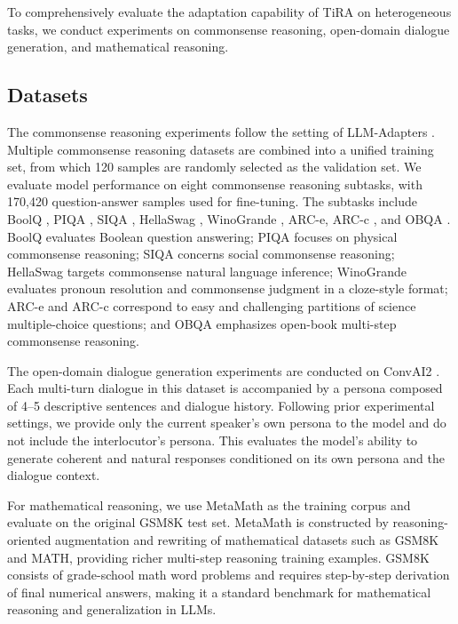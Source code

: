 \documentclass[a4paper,11pt]{article}
\begin{document}
To comprehensively evaluate the adaptation capability of TiRA on heterogeneous tasks, we conduct experiments on commonsense reasoning, open-domain dialogue generation, and mathematical reasoning.

\subsection{Datasets}

The commonsense reasoning experiments follow the setting of LLM-Adapters \cite{hu2023llmadapters}. Multiple commonsense reasoning datasets are combined into a unified training set, from which 120 samples are randomly selected as the validation set. We evaluate model performance on eight commonsense reasoning subtasks, with 170,420 question-answer samples used for fine-tuning. The subtasks include BoolQ \cite{bisk2019boolq}, PIQA \cite{bisk2020piqa}, SIQA \cite{sap2019socialiqa}, HellaSwag \cite{zellers2019hellaswag}, WinoGrande \cite{sakaguchi2021winogrande}, ARC-e, ARC-c \cite{clark2018arc}, and OBQA \cite{mihaylov2018openbookqa}. BoolQ evaluates Boolean question answering; PIQA focuses on physical commonsense reasoning; SIQA concerns social commonsense reasoning; HellaSwag targets commonsense natural language inference; WinoGrande evaluates pronoun resolution and commonsense judgment in a cloze-style format; ARC-e and ARC-c correspond to easy and challenging partitions of science multiple-choice questions; and OBQA emphasizes open-book multi-step commonsense reasoning.

The open-domain dialogue generation experiments are conducted on ConvAI2 \cite{dinan2019convai2}. Each multi-turn dialogue in this dataset is accompanied by a persona composed of 4--5 descriptive sentences and dialogue history. Following prior experimental settings, we provide only the current speaker's own persona to the model and do not include the interlocutor's persona. This evaluates the model's ability to generate coherent and natural responses conditioned on its own persona and the dialogue context.

For mathematical reasoning, we use MetaMath \cite{yu2024metamath} as the training corpus and evaluate on the original GSM8K \cite{cobbe2021gsm8k} test set. MetaMath is constructed by reasoning-oriented augmentation and rewriting of mathematical datasets such as GSM8K and MATH, providing richer multi-step reasoning training examples. GSM8K consists of grade-school math word problems and requires step-by-step derivation of final numerical answers, making it a standard benchmark for mathematical reasoning and generalization in LLMs.
\end{document}
